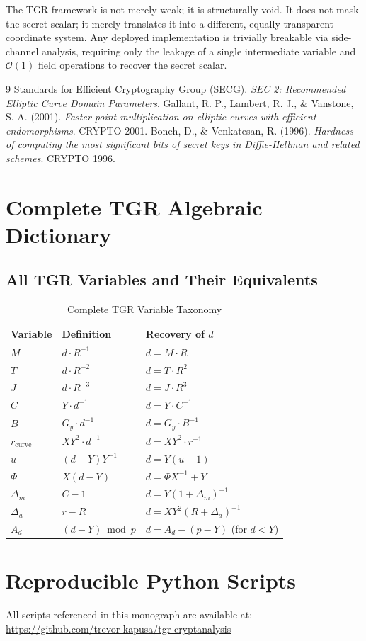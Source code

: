 \documentclass[11pt, a4paper, twoside]{book}
\begin{document}
The TGR framework is not merely weak; it is structurally void. It does not mask the secret scalar; it merely translates it into a different, equally transparent coordinate system. Any deployed implementation is trivially breakable via side-channel analysis, requiring only the leakage of a single intermediate variable and $\mathcal{O}(1)$ field operations to recover the secret scalar.

\backmatter
\begin{thebibliography}{9}
Standards for Efficient Cryptography Group (SECG). \textit{SEC 2: Recommended Elliptic Curve Domain Parameters}.
Gallant, R. P., Lambert, R. J., \& Vanstone, S. A. (2001). \textit{Faster point multiplication on elliptic curves with efficient endomorphisms}. CRYPTO 2001.
Boneh, D., \& Venkatesan, R. (1996). \textit{Hardness of computing the most significant bits of secret keys in Diffie-Hellman and related schemes}. CRYPTO 1996.
\end{thebibliography}

\appendix
\chapter{Complete TGR Algebraic Dictionary}

\section{All TGR Variables and Their Equivalents}

\begin{table}[htbp]
\centering
\caption{Complete TGR Variable Taxonomy}
\begin{tabular}{@{}lll@{}}
\toprule
\textbf{Variable} & \textbf{Definition} & \textbf{Recovery of } $d$ \\ \midrule
$M$ & $d \cdot R^{-1}$ & $d = M \cdot R$ \\
$T$ & $d \cdot R^{-2}$ & $d = T \cdot R^2$ \\
$J$ & $d \cdot R^{-3}$ & $d = J \cdot R^3$ \\
$C$ & $Y \cdot d^{-1}$ & $d = Y \cdot C^{-1}$ \\
$B$ & $G_y \cdot d^{-1}$ & $d = G_y \cdot B^{-1}$ \\
$r_{\text{curve}}$ & $XY^2 \cdot d^{-1}$ & $d = XY^2 \cdot r^{-1}$ \\
$u$ & $(d-Y)Y^{-1}$ & $d = Y(u+1)$ \\
$\Phi$ & $X(d-Y)$ & $d = \Phi X^{-1} + Y$ \\
$\Delta_m$ & $C - 1$ & $d = Y(1+\Delta_m)^{-1}$ \\
$\Delta_a$ & $r - R$ & $d = XY^2(R+\Delta_a)^{-1}$ \\
$A_d$ & $(d-Y) \bmod p$ & $d = A_d - (p-Y)$ (for $d<Y$) \\
\bottomrule
\end{tabular}
\end{table}

\chapter{Reproducible Python Scripts}

All scripts referenced in this monograph are available at: \url{https://github.com/trevor-kapusa/tgr-cryptanalysis}
\end{document}
